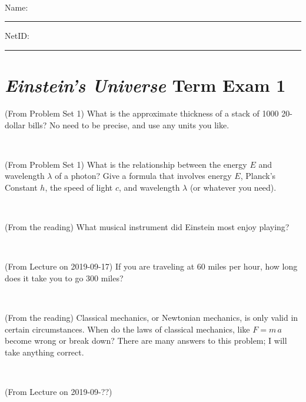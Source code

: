 \documentclass[12pt, letterpaper]{article}
\begin{document}
\vfill ~


\cleardoublepage



\noindent
Name: \rule[-1ex]{0.60\textwidth}{0.1pt}
NetID: \rule[-1ex]{0.20\textwidth}{0.1pt}

\section*{\textsl{Einstein's Universe} Term Exam 1}
\setcounter{problem}{1}


\begin{problem} (From Problem Set 1)
What is the approximate thickness of a stack of 1000 20-dollar bills?
No need to be precise, and use any units you like.
\end{problem}


\vfill ~

\begin{problem} (From Problem Set 1)
What is the relationship between the energy $E$ and wavelength
$\lambda$ of a photon? Give a formula that involves energy $E$,
Planck's Constant $h$, the speed of light $c$, and wavelength
$\lambda$ (or whatever you need).
\end{problem}

\vfill ~

\begin{problem} (From the reading)
What musical instrument did Einstein most enjoy playing?
\end{problem}


\vfill ~

\begin{problem} (From Lecture on 2019-09-17)
If you are traveling at 60 miles per hour, how long does
it take you to go 300 miles?
\end{problem}


\vfill ~


\clearpage


\begin{problem} (From the reading)
Classical mechanics, or Newtonian mechanics, is only valid in certain
circumstances. When do the laws of classical mechanics, like $F =
m\,a$ become wrong or break down? There are many answers to this
problem; I will take anything correct.
\end{problem}


\vfill ~

\begin{problem} (From Lecture on 2019-09-??)
\end{problem}
\end{document}
